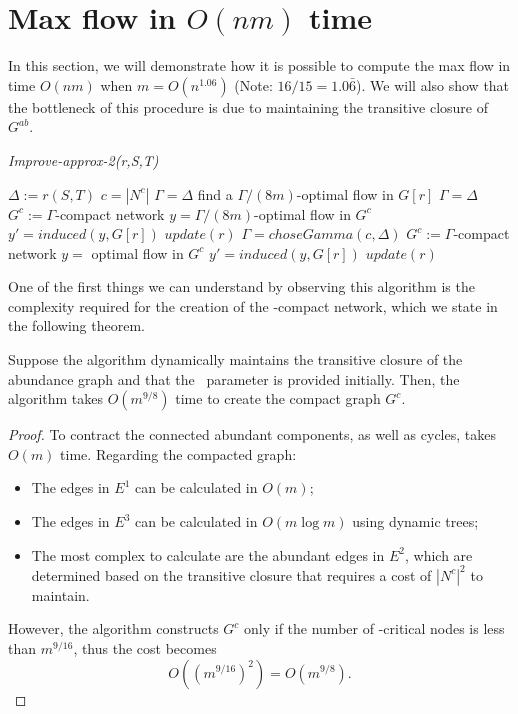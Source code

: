 \section{Max flow in $O(nm)$ time}

In this section, we will demonstrate how it is possible to compute the max flow in time \( O(nm) \) when \( m = O(n^{1.06}) \) (Note: \( 16/15 = 1.0\bar{6} \)). We will also show that the bottleneck of this procedure is due to maintaining the transitive closure of \( G^{ab} \).

\begin{algorithm}
\caption{\textit{Improve-approx-2(r,S,T)}}
\label{imp2}
\begin{algorithmic}[1]
\State $\Delta := r(S,T)$
\State $c = |N^c|$
    \State $\Gamma = \Delta$
    \State find a $\Gamma/(8m)$-optimal flow in $G[r]$
    \State $\Gamma = \Delta$
    \State $G^c:= \Gamma$-compact network
    \State $y=\Gamma/(8m)$-optimal flow in $G^c$
    \State $y' = induced(y, G[r])$
    \State $update(r)$
    $\Gamma = choseGamma(c, \Delta)$
    \State $G^c:= \Gamma$-compact network
    \State $y=$ optimal flow in $G^c$
    \State $y' = induced(y, G[r])$
    \State $update(r)$
\EndIf
\end{algorithmic}
\end{algorithm}

One of the first things we can understand by observing this algorithm is the complexity required for the creation of the \gmm-compact network, which we state in the following theorem.

\begin{theorem}
    \label{tgcomp}
    Suppose the algorithm dynamically maintains the transitive closure of the abundance graph and that the \gmm\ parameter is provided initially. Then, the algorithm takes \( O(m^{9/8}) \) time to create the compact graph \( G^c \).
\end{theorem}

\begin{proof}
    To contract the connected abundant components, as well as cycles, takes \( O(m) \) time. Regarding the compacted graph:
    \begin{itemize}
        \item The edges in \( E^1 \) can be calculated in \( O(m) \);
        \item The edges in \( E^3 \) can be calculated in \( O(m \log m) \) using dynamic trees;
        \item The most complex to calculate are the abundant edges in \( E^2 \), which are determined based on the transitive closure that requires a cost of \( |N^c|^2 \) to maintain.
    \end{itemize}
    However, the algorithm constructs \( G^c \) only if the number of \gmm-critical nodes is less than \( m^{9/16} \), thus the cost becomes
    \[
    O((m^{9/16})^2) = O(m^{9/8}).
    \]
\end{proof}


